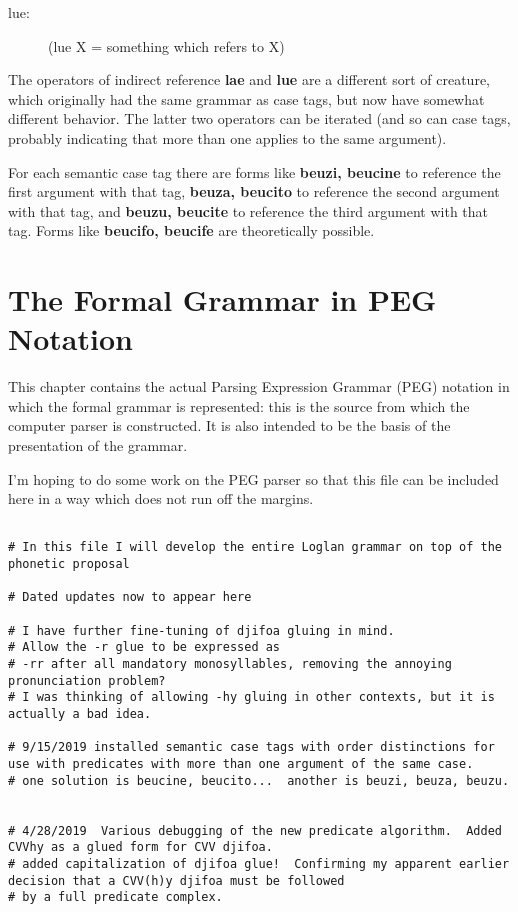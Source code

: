 \documentclass[12pt]{book}
\begin{document}
{\begin{description}
\item[lue:] (lue X = something which refers to X)

\end{description}  The operators of indirect reference {\bf lae} and {\bf lue} are a different sort of creature, which originally had the same grammar as case tags, but now have somewhat different behavior.   The latter two operators can be iterated (and so can case tags, probably indicating that more than one applies to the same argument).

For each semantic case tag there are forms like {\bf beuzi, beucine} to reference the first argument with that tag,  {\bf beuza, beucito} to reference the second argument with that tag,
and {\bf beuzu, beucite} to reference the third argument with that tag.  Forms like {\bf beucifo, beucife} are theoretically possible.

\chapter{The Formal Grammar in PEG Notation}

This chapter contains the actual Parsing Expression Grammar (PEG) notation in which the formal grammar is represented:  this is the source from which the computer parser is constructed.
It is also intended to be the basis of the presentation of the grammar.

I'm hoping to do some work on the PEG parser so that this file can be included here in a way which does not run off the margins.

\begin{verbatim}

# In this file I will develop the entire Loglan grammar on top of the phonetic proposal

# Dated updates now to appear here

# I have further fine-tuning of djifoa gluing in mind.
# Allow the -r glue to be expressed as
# -rr after all mandatory monosyllables, removing the annoying pronunciation problem?
# I was thinking of allowing -hy gluing in other contexts, but it is actually a bad idea.

# 9/15/2019 installed semantic case tags with order distinctions for use with predicates with more than one argument of the same case.
# one solution is beucine, beucito...  another is beuzi, beuza, beuzu.


# 4/28/2019  Various debugging of the new predicate algorithm.  Added CVVhy as a glued form for CVV djifoa.
# added capitalization of djifoa glue!  Confirming my apparent earlier decision that a CVV(h)y djifoa must be followed
# by a full predicate complex.


\end{verbatim}}
\end{document}
